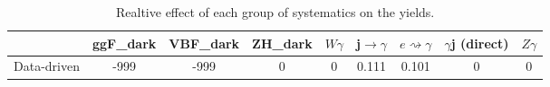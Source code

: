 \documentclass[10pt]{article}
\begin{document}
\begin{table}[htbp]
\begin{center}
\begin{tabular}{|c|c|c|c|c|c|c|c|c|}
\hline 
      & ggF_{dark}      & VBF_{dark}      & ZH_{dark}      & $W\gamma$      & j$\rightarrow\gamma$      & $e\rightsquigarrow\gamma$      & $\gamma$j (direct)      & $Z\gamma$ \\ 
\hline 
 Data-driven & -999 & -999 & 0 & 0 & 0.111 & 0.101 & 0 & 0 \\ 
\hline 
\end{tabular} 
\caption{Realtive effect of each group of systematics on the yields.} 
\end{center} 
\end{table} 
\end{document}
